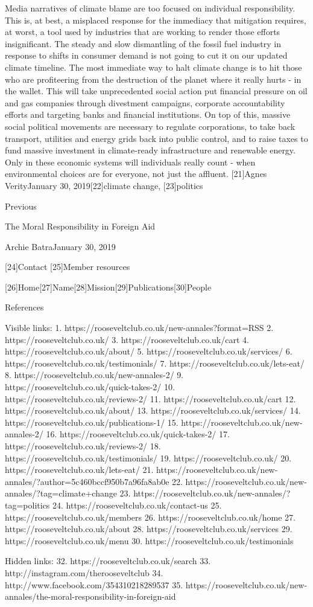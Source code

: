   Media narratives of climate blame are too focused on individual
   responsibility. This is, at best, a misplaced response for the
   immediacy that mitigation requires, at worst, a tool used by industries
   that are working to render those efforts insignificant. The steady and
   slow dismantling of the fossil fuel industry in response to shifts in
   consumer demand is not going to cut it on our updated climate timeline.
   The most immediate way to halt climate change is to hit those who are
   profiteering from the destruction of the planet where it really hurts -
   in the wallet. This will take unprecedented social action put financial
   pressure on oil and gas companies through divestment campaigns,
   corporate accountability efforts and targeting banks and financial
   institutions. On top of this, massive social political movements are
   necessary to regulate corporations, to take back transport, utilities
   and energy grids back into public control, and to raise taxes to fund
   massive investment in climate-ready infrastructure and renewable
   energy. Only in these economic systems will individuals really count -
   when environmental choices are for everyone, not just the affluent.
   [21]Agnes VerityJanuary 30, 2019[22]climate change, [23]politics

   Previous

The Moral Responsibility in Foreign Aid

   Archie BatraJanuary 30, 2019

   [24]Contact
   [25]Member resources

   [26]Home[27]Name[28]Mission[29]Publications[30]People

References

   Visible links:
   1. https://rooseveltclub.co.uk/new-annales?format=RSS
   2. https://rooseveltclub.co.uk/
   3. https://rooseveltclub.co.uk/cart
   4. https://rooseveltclub.co.uk/about/
   5. https://rooseveltclub.co.uk/services/
   6. https://rooseveltclub.co.uk/testimonials/
   7. https://rooseveltclub.co.uk/lets-eat/
   8. https://rooseveltclub.co.uk/new-annales-2/
   9. https://rooseveltclub.co.uk/quick-takes-2/
  10. https://rooseveltclub.co.uk/reviews-2/
  11. https://rooseveltclub.co.uk/cart
  12. https://rooseveltclub.co.uk/about/
  13. https://rooseveltclub.co.uk/services/
  14. https://rooseveltclub.co.uk/publications-1/
  15. https://rooseveltclub.co.uk/new-annales-2/
  16. https://rooseveltclub.co.uk/quick-takes-2/
  17. https://rooseveltclub.co.uk/reviews-2/
  18. https://rooseveltclub.co.uk/testimonials/
  19. https://rooseveltclub.co.uk/
  20. https://rooseveltclub.co.uk/lets-eat/
  21. https://rooseveltclub.co.uk/new-annales/?author=5c460bccf950b7a96fa8ab0e
  22. https://rooseveltclub.co.uk/new-annales/?tag=climate+change
  23. https://rooseveltclub.co.uk/new-annales/?tag=politics
  24. https://rooseveltclub.co.uk/contact-us
  25. https://rooseveltclub.co.uk/members
  26. https://rooseveltclub.co.uk/home
  27. https://rooseveltclub.co.uk/about
  28. https://rooseveltclub.co.uk/services
  29. https://rooseveltclub.co.uk/menu
  30. https://rooseveltclub.co.uk/testimonials

   Hidden links:
  32. https://rooseveltclub.co.uk/search
  33. http://instagram.com/therooseveltclub
  34. http://www.facebook.com/354310218289537
  35. https://rooseveltclub.co.uk/new-annales/the-moral-responsibility-in-foreign-aid
